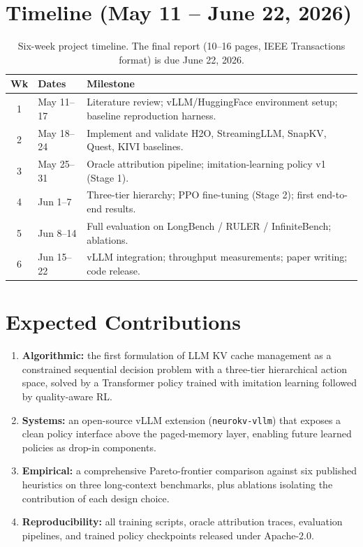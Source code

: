 \documentclass[journal]{IEEEtran}
\begin{document}
\section{Timeline (May 11 -- June 22, 2026)}
\begin{table}[t]
\centering
\caption{Six-week project timeline. The final report (10--16 pages, IEEE Transactions format) is due June 22, 2026.}
\label{tab:gantt}
\renewcommand{\arraystretch}{1.15}
\begin{tabular}{@{}clp{4.6cm}@{}}
\toprule
\textbf{Wk} & \textbf{Dates} & \textbf{Milestone} \\
\midrule
1 & May 11--17 & Literature review; vLLM/HuggingFace environment setup; baseline reproduction harness. \\
2 & May 18--24 & Implement and validate H2O, StreamingLLM, SnapKV, Quest, KIVI baselines. \\
3 & May 25--31 & Oracle attribution pipeline; imitation-learning policy v1 (Stage 1). \\
4 & Jun 1--7   & Three-tier hierarchy; PPO fine-tuning (Stage 2); first end-to-end results. \\
5 & Jun 8--14  & Full evaluation on LongBench / RULER / InfiniteBench; ablations. \\
6 & Jun 15--22 & vLLM integration; throughput measurements; paper writing; code release. \\
\bottomrule
\end{tabular}
\end{table}

\section{Expected Contributions}
\begin{enumerate}
    \item \textbf{Algorithmic:} the first formulation of LLM KV cache management as a constrained sequential decision problem with a three-tier hierarchical action space, solved by a Transformer policy trained with imitation learning followed by quality-aware RL.
    \item \textbf{Systems:} an open-source vLLM extension (\texttt{neurokv-vllm}) that exposes a clean policy interface above the paged-memory layer, enabling future learned policies as drop-in components.
    \item \textbf{Empirical:} a comprehensive Pareto-frontier comparison against six published heuristics on three long-context benchmarks, plus ablations isolating the contribution of each design choice.
    \item \textbf{Reproducibility:} all training scripts, oracle attribution traces, evaluation pipelines, and trained policy checkpoints released under Apache-2.0.
\end{enumerate}
\end{document}
